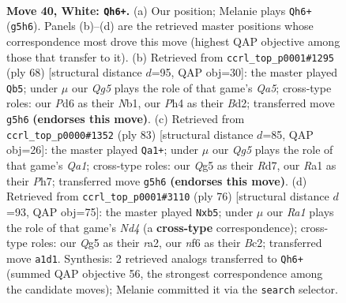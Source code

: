 \documentclass[11pt]{article}
\begin{document}
\clearpage

\begin{figure}[p]\centering
\begin{subfigure}{0.46\textwidth}\centering
\resizebox{\linewidth}{!}{%
\newchessgame
\chessboard[
  setfen={3q1k2/1b1n1p2/3P1n2/2p3Qp/p6P/5pP1/PB6/R5K1 w - - 0 40},
  showmover=false,
  pgfstyle=straightmove, color=movearrow, markmove={g5-h6}
]}
\caption{}
\end{subfigure}\hfill
\begin{subfigure}{0.46\textwidth}\centering
\resizebox{\linewidth}{!}{%
\newchessgame
\chessboard[
  setfen={4r1k1/5pb1/5n1p/Q2n1q2/3p2pP/6P1/P2B1PB1/1NR3K1 w - - 5 35},
  showmover=false,
  pgfstyle=straightmove, color=movearrow, markmove={a5-b5}
]}
\caption{}
\end{subfigure}
\\[4pt]
\begin{subfigure}{0.46\textwidth}\centering
\resizebox{\linewidth}{!}{%
\newchessgame
\chessboard[
  setfen={q6k/3r3p/1p1P2pb/4R3/2p1N1P1/2N1nQ1P/1P6/7K b - - 0 42},
  showmover=false,
  pgfstyle=straightmove, color=movearrow, markmove={a8-a1}
]}
\caption{}
\end{subfigure}\hfill
\begin{subfigure}{0.46\textwidth}\centering
\resizebox{\linewidth}{!}{%
\newchessgame
\chessboard[
  setfen={3q2k1/3n1p2/5np1/1p1P2Q1/1PpN4/2P4P/r1B2RK1/8 w - - 3 39},
  showmover=false,
  pgfstyle=straightmove, color=movearrow, markmove={d4-b5}
]}
\caption{}
\end{subfigure}
\caption{\textbf{Move 40, White: \texttt{Qh6+}.} (a) Our position; Melanie plays \texttt{Qh6+} (\texttt{g5h6}). Panels (b)--(d) are the retrieved master positions whose correspondence most drove this move (highest QAP objective among those that transfer to it). (b) Retrieved from \texttt{ccrl\_top\_p0001\#1295} (ply 68) [structural distance $d$=95, QAP obj=30]: the master played \texttt{Qb5}; under $\mu$ our \emph{Qg5} plays the role of that game's \emph{Qa5}; cross-type roles: our \emph{P}d6 as their \emph{N}b1, our \emph{P}h4 as their \emph{B}d2; transferred move \texttt{g5h6} \textbf{(endorses this move)}. (c) Retrieved from \texttt{ccrl\_top\_p0000\#1352} (ply 83) [structural distance $d$=85, QAP obj=26]: the master played \texttt{Qa1+}; under $\mu$ our \emph{Qg5} plays the role of that game's \emph{Qa1}; cross-type roles: our \emph{Q}g5 as their \emph{R}d7, our \emph{R}a1 as their \emph{P}h7; transferred move \texttt{g5h6} \textbf{(endorses this move)}. (d) Retrieved from \texttt{ccrl\_top\_p0001\#3110} (ply 76) [structural distance $d$=93, QAP obj=75]: the master played \texttt{Nxb5}; under $\mu$ our \emph{Ra1} plays the role of that game's \emph{Nd4} (a \textbf{cross-type} correspondence); cross-type roles: our \emph{Q}g5 as their \emph{r}a2, our \emph{n}f6 as their \emph{B}c2; transferred move \texttt{a1d1}. Synthesis: 2 retrieved analogs transferred to \texttt{Qh6+} (summed QAP objective 56, the strongest correspondence among the candidate moves); Melanie committed it via the \texttt{search} selector.}
\label{fig:thought-m78}
\end{figure}
\end{document}
